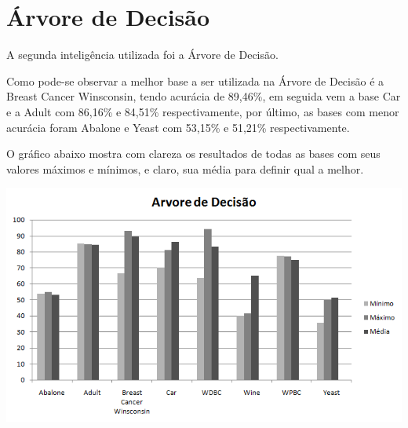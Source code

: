 \section{Árvore de Decisão}
\label{sec:arvore}

A segunda inteligência utilizada foi a Árvore de Decisão.

Como pode-se observar a melhor base a ser utilizada na Árvore de Decisão é a Breast Cancer Winsconsin, tendo acurácia de 89,46\%, em seguida vem a base Car e a Adult com 86,16\% e 84,51\% respectivamente, por último, as bases com menor acurácia foram Abalone e Yeast com 53,15\% e 51,21\% respectivamente.

O gráfico abaixo mostra com clareza os resultados de todas as bases com seus valores máximos e mínimos, e claro, sua média para definir qual a melhor.

\begin{center}
      \includegraphics[scale=1.0]{imagens/arvore.png}
\end{center}